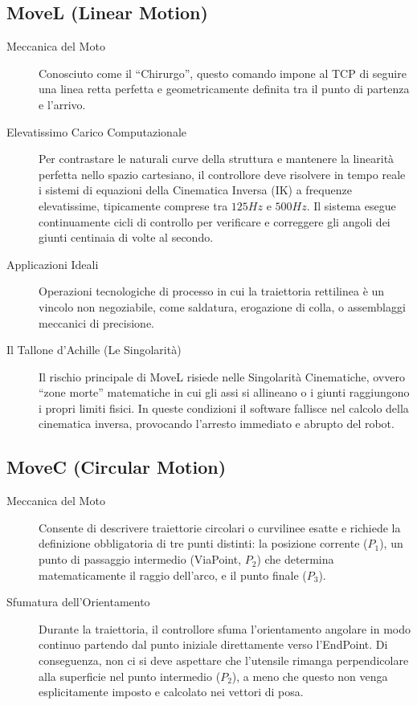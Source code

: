 \subsection{MoveL (Linear Motion)}
\begin{description}
    \item [Meccanica del Moto] Conosciuto come il ``Chirurgo'', questo comando impone al TCP di seguire una linea retta perfetta e geometricamente definita tra il punto di partenza e l'arrivo.
    \item [Elevatissimo Carico Computazionale] Per contrastare le naturali curve della struttura e mantenere la linearità perfetta nello spazio cartesiano, il controllore deve risolvere in tempo reale i sistemi di equazioni della Cinematica Inversa (IK) a frequenze elevatissime, tipicamente comprese tra $125\si{Hz}$ e $500 \si{Hz}$. Il sistema esegue continuamente cicli di controllo per verificare e correggere gli angoli dei giunti centinaia di volte al secondo.
    \item [Applicazioni Ideali] Operazioni tecnologiche di processo in cui la traiettoria rettilinea è un vincolo non negoziabile, come saldatura, erogazione di colla, o assemblaggi meccanici di precisione.
    \item [Il Tallone d'Achille (Le Singolarità)] Il rischio principale di MoveL risiede nelle Singolarità Cinematiche, ovvero ``zone morte'' matematiche in cui gli assi si allineano o i giunti raggiungono i propri limiti fisici. In queste condizioni il software fallisce nel calcolo della cinematica inversa, provocando l'arresto immediato e abrupto del robot.
\end{description}
%
\subsection{MoveC (Circular Motion)}
\begin{description}
    \item [Meccanica del Moto] Consente di descrivere traiettorie circolari o curvilinee esatte e richiede la definizione obbligatoria di tre punti distinti: la posizione corrente ($P_1$), un punto di passaggio intermedio (ViaPoint, $P_2$) che determina matematicamente il raggio dell'arco, e il punto finale ($P_3$).
    \item [Sfumatura dell'Orientamento] Durante la traiettoria, il controllore sfuma l'orientamento angolare in modo continuo partendo dal punto iniziale direttamente verso l'EndPoint. Di conseguenza, non ci si deve aspettare che l'utensile rimanga perpendicolare alla superficie nel punto intermedio ($P_2$), a meno che questo non venga esplicitamente imposto e calcolato nei vettori di posa.
\end{description}
%
